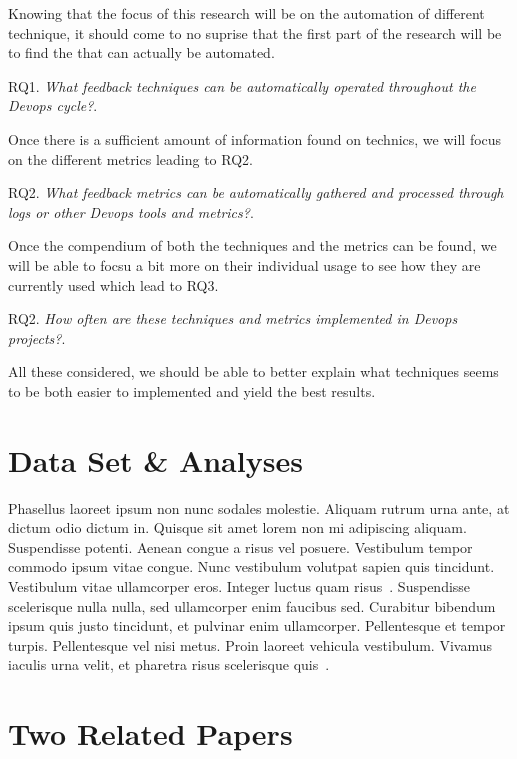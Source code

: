 \documentclass[10pt, conference]{IEEEtran}
\begin{document}
Knowing that the focus of this research will be on the automation of different technique, it should come to no suprise that the first part of the research will be to find the that can actually be automated.
\begin{displayquote}
  RQ1. \emph{What feedback techniques can be automatically operated throughout the Devops cycle?}.
\end{displayquote} 
Once there is a sufficient amount of information found on technics, we will focus on the different metrics leading to RQ2.
\begin{displayquote}
  RQ2. \emph{What feedback metrics can be automatically gathered and processed through logs or other Devops tools and metrics?}.
\end{displayquote} 
Once the compendium of both the techniques and the metrics can be found, we will be able to focsu a bit more on their individual usage to see how they are currently used which lead to RQ3.
\begin{displayquote}
  RQ2. \emph{How often are these techniques and metrics implemented in Devops projects?}.
\end{displayquote} 

All these considered, we should be able to better explain what techniques seems to be both easier to implemented and yield the best results. 


\section{Data Set \& Analyses}
\label{sec:backgr-relat-work}

Phasellus laoreet ipsum non nunc sodales molestie. Aliquam rutrum urna ante, at dictum odio dictum in. Quisque sit amet lorem non mi adipiscing aliquam. Suspendisse potenti. Aenean congue a risus vel posuere. Vestibulum tempor commodo ipsum vitae congue. Nunc vestibulum volutpat sapien quis tincidunt. Vestibulum vitae ullamcorper eros. Integer luctus quam risus~\cite{humble10}. Suspendisse scelerisque nulla nulla, sed ullamcorper enim faucibus sed. Curabitur bibendum ipsum quis justo tincidunt, et pulvinar enim ullamcorper. Pellentesque et tempor turpis. Pellentesque vel nisi metus. Proin laoreet vehicula vestibulum. Vivamus iaculis urna velit, et pharetra risus scelerisque quis~\cite{baysal11}.

\section{Two Related Papers}
\label{sec:two-related-papers}
\end{document}
